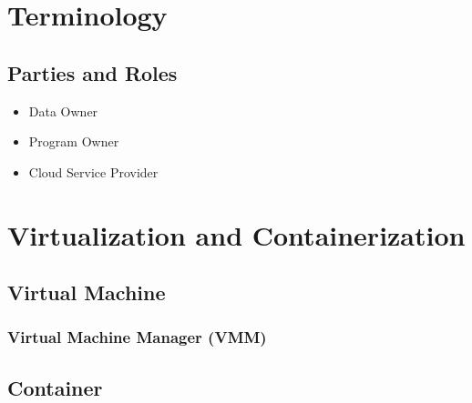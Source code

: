 

\chapter{Terminology}


\section{Parties and Roles}

\begin{itemize}
  \item Data Owner
  \item Program Owner
  \item Cloud Service Provider
\end{itemize}


\chapter{Virtualization and Containerization}

\section{Virtual Machine}

\subsection{Virtual Machine Manager (VMM)}

\section{Container}

